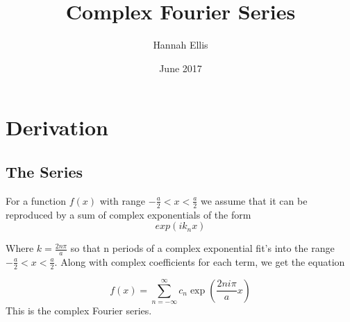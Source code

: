 \documentclass[11pt,twoside,a5paper]{book}
\begin{document}
\title{Complex Fourier Series}
\author{Hannah Ellis}
\date{June 2017}
\maketitle
\tableofcontents
\chapter{Derivation}

\section{The Series}
For a function $f(x)$ with range $-\frac{a}{2}<x<\frac{a}{2}$ we assume that it can
be reproduced by a sum of complex exponentials of the form
\begin{equation}
exp(i k_n x)
\end{equation}

Where $k=\frac{2n\pi}{a}$ so that n periods of a complex exponential fit's into
the range $-\frac{a}{2}<x<\frac{a}{2}$. Along with complex coefficients for each
term, we get the equation

\begin{equation}
\label{eq:cfs}
f(x)=\sum_{n=-\infty}^{\infty} c_n \exp\left(\frac{2ni\pi}{a}x\right)
\end{equation}
This is the complex Fourier series.
\end{document}
